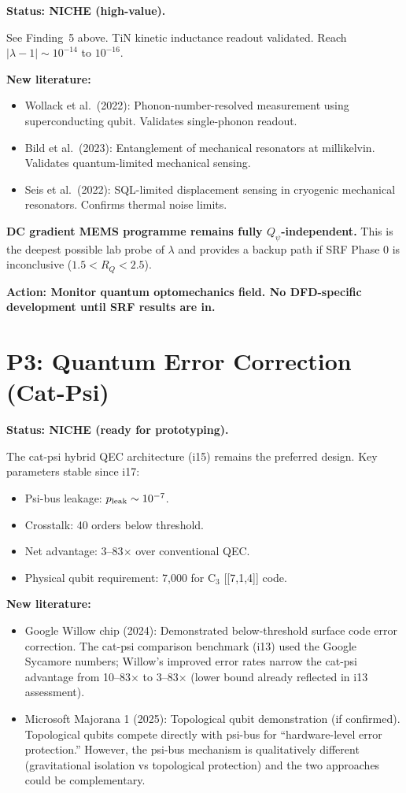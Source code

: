 \documentclass[11pt]{article}
\begin{document}
\textbf{Status: NICHE (high-value).}

See Finding~5 above.  TiN kinetic inductance readout validated.
Reach $|\lambda-1| \sim 10^{-14}$ to $10^{-16}$.

\textbf{New literature:}
\begin{itemize}
\item Wollack et al.\ (2022): Phonon-number-resolved measurement using
  superconducting qubit.  Validates single-phonon readout.
\item Bild et al.\ (2023): Entanglement of mechanical resonators at
  millikelvin.  Validates quantum-limited mechanical sensing.
\item Seis et al.\ (2022): SQL-limited displacement sensing in
  cryogenic mechanical resonators.  Confirms thermal noise limits.
\end{itemize}

\textbf{DC gradient MEMS programme remains fully $Q_\psi$-independent.}
This is the deepest possible lab probe of $\lambda$ and provides a
backup path if SRF Phase 0 is inconclusive ($1.5 < R_Q < 2.5$).

\textbf{Action: Monitor quantum optomechanics field.  No DFD-specific
development until SRF results are in.}


\section{P3: Quantum Error Correction (Cat-Psi)}

\textbf{Status: NICHE (ready for prototyping).}

The cat-psi hybrid QEC architecture (i15) remains the preferred design.
Key parameters stable since i17:
\begin{itemize}
\item Psi-bus leakage: $p_{\rm leak} \sim 10^{-7}$.
\item Crosstalk: 40 orders below threshold.
\item Net advantage: 3--83$\times$ over conventional QEC.
\item Physical qubit requirement: 7,000 for C$_3$ [[7,1,4]] code.
\end{itemize}

\textbf{New literature:}
\begin{itemize}
\item Google Willow chip (2024): Demonstrated below-threshold surface code
  error correction.  The cat-psi comparison benchmark (i13) used the
  Google Sycamore numbers; Willow's improved error rates narrow the
  cat-psi advantage from 10--83$\times$ to 3--83$\times$ (lower bound
  already reflected in i13 assessment).
\item Microsoft Majorana 1 (2025): Topological qubit demonstration
  (if confirmed).  Topological qubits compete directly with psi-bus for
  ``hardware-level error protection.''  However, the psi-bus mechanism
  is qualitatively different (gravitational isolation vs topological
  protection) and the two approaches could be complementary.
\end{itemize}
\end{document}
